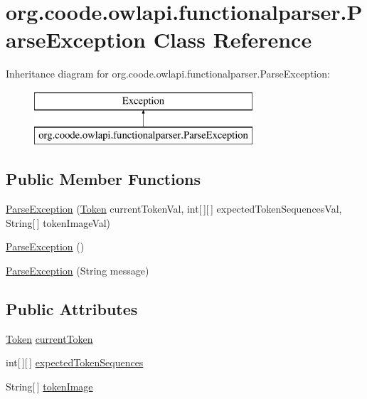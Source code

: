 \hypertarget{classorg_1_1coode_1_1owlapi_1_1functionalparser_1_1_parse_exception}{\section{org.\-coode.\-owlapi.\-functionalparser.\-Parse\-Exception Class Reference}
\label{classorg_1_1coode_1_1owlapi_1_1functionalparser_1_1_parse_exception}
}
Inheritance diagram for org.\-coode.\-owlapi.\-functionalparser.\-Parse\-Exception\-:\begin{figure}[H]
\begin{center}
\leavevmode
\includegraphics[height=2.000000cm]{classorg_1_1coode_1_1owlapi_1_1functionalparser_1_1_parse_exception}
\end{center}
\end{figure}
\subsection*{Public Member Functions}
\begin{DoxyCompactItemize}
\item 
\hyperlink{classorg_1_1coode_1_1owlapi_1_1functionalparser_1_1_parse_exception_aa084d283b143212c12d6a45f3ae2850e}{Parse\-Exception} (\hyperlink{classorg_1_1coode_1_1owlapi_1_1functionalparser_1_1_token}{Token} current\-Token\-Val, int\mbox{[}$\,$\mbox{]}\mbox{[}$\,$\mbox{]} expected\-Token\-Sequences\-Val, String\mbox{[}$\,$\mbox{]} token\-Image\-Val)
\item 
\hyperlink{classorg_1_1coode_1_1owlapi_1_1functionalparser_1_1_parse_exception_ab10c9ea9e26291792189a44091672a65}{Parse\-Exception} ()
\item 
\hyperlink{classorg_1_1coode_1_1owlapi_1_1functionalparser_1_1_parse_exception_ab792f479949232807e4c7da4477bfc66}{Parse\-Exception} (String message)
\end{DoxyCompactItemize}
\subsection*{Public Attributes}
\begin{DoxyCompactItemize}
\item 
\hyperlink{classorg_1_1coode_1_1owlapi_1_1functionalparser_1_1_token}{Token} \hyperlink{classorg_1_1coode_1_1owlapi_1_1functionalparser_1_1_parse_exception_a95fb43c042d0cb8076312c0d2b7fc2b4}{current\-Token}
\item 
int\mbox{[}$\,$\mbox{]}\mbox{[}$\,$\mbox{]} \hyperlink{classorg_1_1coode_1_1owlapi_1_1functionalparser_1_1_parse_exception_afa77568b87bfcc8bbc2460a8efd1a15f}{expected\-Token\-Sequences}
\item 
String\mbox{[}$\,$\mbox{]} \hyperlink{classorg_1_1coode_1_1owlapi_1_1functionalparser_1_1_parse_exception_ae954fccb0efb481cee03b85bdab0faec}{token\-Image}
\end{DoxyCompactItemize}
